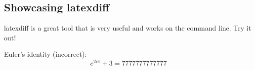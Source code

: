 \documentclass[12pt]{article}
\begin{document}
\begin{flushleft}

\section{Showcasing latexdiff}

latexdiff is a great tool that is very useful and works on the command line. Try it out! \newline

Euler's identity (incorrect):
\begin{equation}
e^{2 i \pi} + 3 = 7777777777777
\end{equation}



\end{flushleft}
\end{document}
